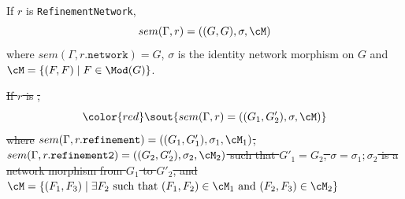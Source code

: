 \documentclass[10pt,fleqn,final]{scrreprt}
\newcommand*{\syntax}[1]{\texttt{#1}}
\newenvironment{definitions}[0]{\medskip }{}
\providecommand{\DIFdel}[1]{{\protect\color{red}\sout{#1}}}                      %
\providecommand{\DIFdelbegin}{} %
\providecommand{\DIFdelend}{} %
\begin{document}
\begin{definitions}
If $r$ is \syntax{RefinementNetwork},
$$sem(\Gamma, r) = ((G, G), \sigma, \cM)$$
\noindent 
where $sem(\Gamma, r.\syntax{network}) = G$,
$\sigma$ is the identity network morphism on $G$
and 
$\cM = \{ (F, F) \mid F \in \Mod(G)\}$.

\DIFdelbegin \DIFdel{If $r$ is }%
\DIFdel{,
}\begin{displaymath}\DIFdel{sem(\Gamma, r) = 
((G_1, G'_2), \sigma, \cM)}\end{displaymath}
\DIFdel{where}%
\DIFdel{$sem(\Gamma, r.\syntax{refinement}) = 
((G_1, G'_1), \sigma_1, \cM_1)$,
$sem(\Gamma, r.\syntax{refinement2}) = 
((G_2, G'_2), \sigma_2, \cM_2)$
such that $G'_1 = G_2$,
$\sigma = \sigma_1;\sigma_2$
is a network morphism from $G_1$ to $G'_2$, 
and
$\cM = \{(F_1, F_3) \mid \exists F_2 \text{ such that } 
(F_1, F_2) \in \cM_1  \text{ and }
(F_2, F_3) \in \cM_2  \}$
}\DIFdelend %


\end{definitions}
\end{document}
